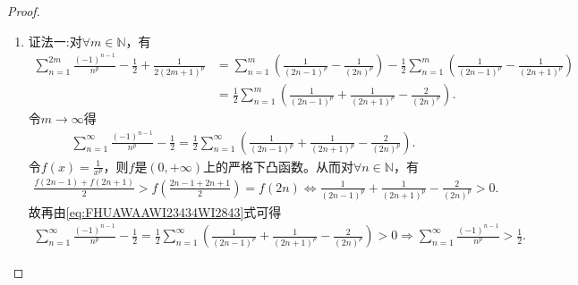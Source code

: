 \documentclass[../../main.tex]{subfiles}%
\begin{document}
\begin{proof}
\begin{enumerate}[(1)]
\item {\color{blue}证法一:}对$\forall m\in \mathbb{N}$，有
\begin{align*}
\sum\limits_{n=1}^{2m} \frac{(-1)^{n-1}}{n^p} - \frac{1}{2} + \frac{1}{2(2m+1)^p}
&= \sum\limits_{n=1}^{m} \left( \frac{1}{(2n-1)^p} - \frac{1}{(2n)^p} \right) - \frac{1}{2} \sum\limits_{n=1}^{m} \left( \frac{1}{(2n-1)^p} - \frac{1}{(2n+1)^p} \right) \\
&= \frac{1}{2} \sum\limits_{n=1}^{m} \left( \frac{1}{(2n-1)^p} + \frac{1}{(2n+1)^p} - \frac{2}{(2n)^p} \right).
\end{align*}
令$m\to\infty$得
\begin{align}
\sum\limits_{n=1}^{\infty} \frac{(-1)^{n-1}}{n^p} - \frac{1}{2} = \frac{1}{2} \sum\limits_{n=1}^{\infty} \left( \frac{1}{(2n-1)^p} + \frac{1}{(2n+1)^p} - \frac{2}{(2n)^p} \right).
\label{eq:FHUAWAAWI23434WI2843}
\end{align}
令$f(x) = \frac{1}{x^p}$，则$f$是$(0,+\infty)$上的严格下凸函数。从而对$\forall n\in \mathbb{N}$，有
\begin{align*}
\frac{f(2n-1) + f(2n+1)}{2} > f\left( \frac{2n-1+2n+1}{2} \right) = f(2n)
\Longleftrightarrow \frac{1}{(2n-1)^p} + \frac{1}{(2n+1)^p} - \frac{2}{(2n)^p} > 0.
\end{align*}
故再由\eqref{eq:FHUAWAAWI23434WI2843}式可得
\begin{align*}
\sum\limits_{n=1}^{\infty} \frac{(-1)^{n-1}}{n^p} - \frac{1}{2} = \frac{1}{2} \sum\limits_{n=1}^{\infty} \left( \frac{1}{(2n-1)^p} + \frac{1}{(2n+1)^p} - \frac{2}{(2n)^p} \right) > 0
\Longrightarrow \sum\limits_{n=1}^{\infty} \frac{(-1)^{n-1}}{n^p} > \frac{1}{2}.
\end{align*}


\end{enumerate}
\end{proof}
\end{document}
